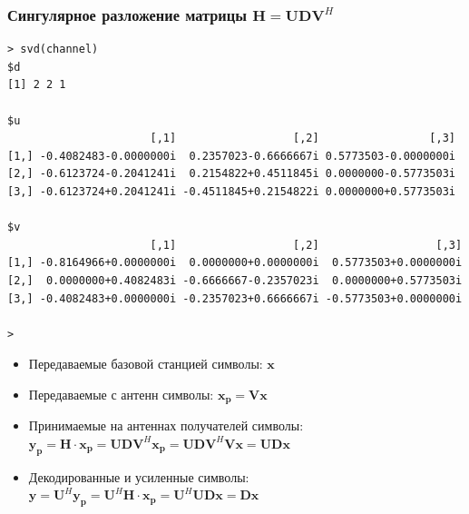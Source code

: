 \documentclass[utf8]{beamer}
\begin{document}
\begin{frame}[fragile]
\frametitle{Сингулярное разложение матрицы $\mathbf{H} = \mathbf{U} \mathbf{D} \mathbf {V}^{H}$}
{
\tiny
\begin{verbatim}
> svd(channel)
$d
[1] 2 2 1

$u
                      [,1]                  [,2]                 [,3]
[1,] -0.4082483-0.0000000i  0.2357023-0.6666667i 0.5773503-0.0000000i
[2,] -0.6123724-0.2041241i  0.2154822+0.4511845i 0.0000000-0.5773503i
[3,] -0.6123724+0.2041241i -0.4511845+0.2154822i 0.0000000+0.5773503i

$v
                      [,1]                  [,2]                  [,3]
[1,] -0.8164966+0.0000000i  0.0000000+0.0000000i  0.5773503+0.0000000i
[2,]  0.0000000+0.4082483i -0.6666667-0.2357023i  0.0000000+0.5773503i
[3,] -0.4082483+0.0000000i -0.2357023+0.6666667i -0.5773503+0.0000000i

>
\end{verbatim}
}
\begin{itemize}
  \item Передаваемые базовой станцией символы: $\mathbf{x}$
  \item Передаваемые с антенн символы: 
  $
  \mathbf{x_p} = \mathbf {V} \mathbf {x}
  $
  \item Принимаемые на антеннах получателей символы:
  $
  \mathbf{y_p} = \mathbf{H}\cdot \mathbf{x_p} = \mathbf{U} \mathbf{D} \mathbf {V}^{H} \mathbf{x_p} =
  \mathbf{U} \mathbf{D} \mathbf {V}^{H} \mathbf {V} \mathbf {x} =
  \mathbf{U} \mathbf{D} \mathbf{x}
  $
  \item Декодированные и усиленные символы:
  $
  \mathbf{y} = \mathbf{U}^H \mathbf{y_p} =
  \mathbf{U}^H \mathbf{H}\cdot \mathbf{x_p} = \mathbf{U}^H \mathbf{U} \mathbf{D} \mathbf{x} = \mathbf{D} \mathbf{x}
  $
\end{itemize}
\end{frame}
\end{document}
